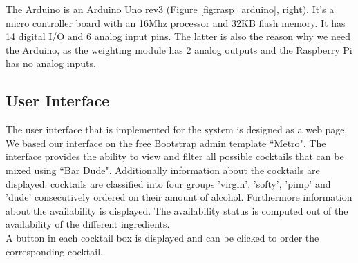 \documentclass{acm_proc_article-sp}
\begin{document}
The Arduino is an Arduino Uno rev3 (Figure \ref{fig:rasp_arduino}, right). It's a micro controller board with an 16Mhz processor and 32KB flash memory. It has 14 digital I/O and 6 analog input pins. The latter is also the reason why we need the Arduino, as the weighting module has 2 analog outputs and the Raspberry Pi has no analog inputs.

\begin{minipage}{\linewidth}%
\label{fig:rasp_arduino}%
\end{minipage}
 
\subsection{User Interface}
The user interface that is implemented for the system is designed as a web page. We based our interface on the free Bootstrap admin template ``Metro". The interface provides the ability to view and filter all possible cocktails that can be mixed using ``Bar Dude". Additionally information about the cocktails are displayed: cocktails are classified into four groups 'virgin', 'softy', 'pimp' and 'dude' consecutively ordered on their amount of alcohol. Furthermore information about the availability is displayed. The availability status is computed out of the availability of the different ingredients. \\
A button in each cocktail box is displayed and can be clicked to order the corresponding cocktail.
\end{document}
